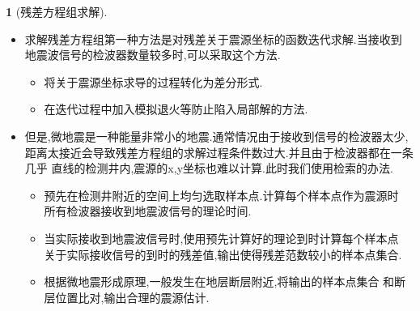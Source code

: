 \documentclass[UTF8]{ctexbeamer}	%
\theoremstyle{plain}
\theoremstyle{definition}
\newtheorem{emt}{}[section]
\theoremstyle{remark}
\numberwithin{equation}{section}
\begin{document}
\begin{frame}
    \begin{emt}[残差方程组求解]
        \begin{itemize}
            \item 求解残差方程组第一种方法是对残差关于震源坐标的函数迭代求解.当接收到
            地震波信号的检波器数量较多时,可以采取这个方法.
            \begin{itemize}
                \item 将关于震源坐标求导的过程转化为差分形式.
                \item 在迭代过程中加入模拟退火等防止陷入局部解的方法.
            \end{itemize}

            \item 但是,微地震是一种能量非常小的地震.通常情况由于接收到信号的检波器太少,
            距离太接近会导致残差方程组的求解过程条件数过大.并且由于检波器都在一条几乎
            直线的检测井内,震源的x,y坐标也难以计算.此时我们使用检索的办法.

            \begin{itemize}
                \item 预先在检测井附近的空间上均匀选取样本点.计算每个样本点作为震源时
                所有检波器接收到地震波信号的理论时间.

                \item 当实际接收到地震波信号时,使用预先计算好的理论到时计算每个样本点
                关于实际接收信号的到时的残差值,输出使得残差范数较小的样本点集合.

                \item 根据微地震形成原理,一般发生在地层断层附近,将输出的样本点集合
                和断层位置比对,输出合理的震源估计.
            \end{itemize}
        \end{itemize}
    \end{emt}
\end{frame}
\end{document}
